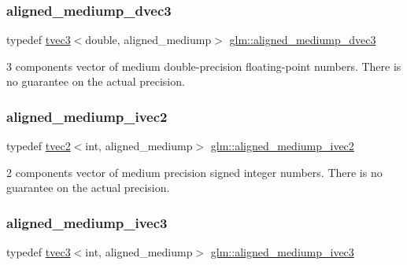 \subsubsection{\texorpdfstring{aligned\+\_\+mediump\+\_\+dvec3}{aligned\_mediump\_dvec3}}
{\footnotesize\ttfamily typedef \hyperlink{structglm_1_1tvec3}{tvec3}$<$double, aligned\+\_\+mediump$>$ \hyperlink{group__gtc__type__aligned_ga1ba09491d449d986ea0d63172e96a598}{glm\+::aligned\+\_\+mediump\+\_\+dvec3}}

3 components vector of medium double-\/precision floating-\/point numbers. There is no guarantee on the actual precision. \mbox{\label{group__gtc__type__aligned_ga7c713a802c9a63481c0bab775e16d003}} 
\subsubsection{\texorpdfstring{aligned\+\_\+mediump\+\_\+ivec2}{aligned\_mediump\_ivec2}}
{\footnotesize\ttfamily typedef \hyperlink{structglm_1_1tvec2}{tvec2}$<$int, aligned\+\_\+mediump$>$ \hyperlink{group__gtc__type__aligned_ga7c713a802c9a63481c0bab775e16d003}{glm\+::aligned\+\_\+mediump\+\_\+ivec2}}

2 components vector of medium precision signed integer numbers. There is no guarantee on the actual precision. \mbox{\label{group__gtc__type__aligned_gad97de0d98f61227f3504dcd5f965ff3a}} 
\subsubsection{\texorpdfstring{aligned\+\_\+mediump\+\_\+ivec3}{aligned\_mediump\_ivec3}}
{\footnotesize\ttfamily typedef \hyperlink{structglm_1_1tvec3}{tvec3}$<$int, aligned\+\_\+mediump$>$ \hyperlink{group__gtc__type__aligned_gad97de0d98f61227f3504dcd5f965ff3a}{glm\+::aligned\+\_\+mediump\+\_\+ivec3}}

